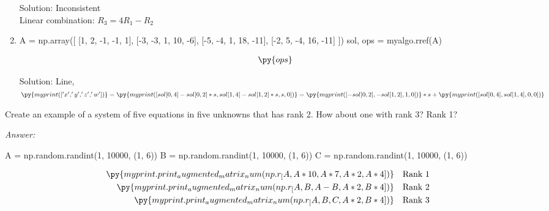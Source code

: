 \documentclass[letter]{article}
\newcommand{\ans}{\textit{Answer: }}
\newenvironment{question}[2][Question]{\begin{trivlist}
\item[\hskip \labelsep {\bfseries #1}\hskip \labelsep {\bfseries #2.}]}{\end{trivlist}}
\begin{document}
\begin{question}{1.55}
\begin{enumerate}[label=\alph*]
  Solution: Inconsistent \\
  Linear combination: $R_3 = 4R_1 - R_2$

  \item \begin{pycode}
A = np.array([
  [1, 2, -1, -1, 1],
  [-3, -3, 1, 10, -6],
  [-5, -4, 1, 18, -11],
  [-2, 5, -4, 16, -11]
])
sol, ops = myalgo.rref(A)
  \end{pycode}
  \begin{align*}
    \py{ops}
  \end{align*}

  Solution: Line, $
  \py{myprint(['x', 'y', 'z', 'w'])} 
  = \py{myprint([
      sol[0, 4]-sol[0, 2] * s,
      sol[1, 4]-sol[1, 2] * s,
      s,
      0
    ])} 
  = \py{myprint([
      -sol[0, 2],
      -sol[1, 2],
      1,
      0
    ])} * s + \py{myprint([
      sol[0, 4],
      sol[1, 4],
      0,
      0
    ])}
  $

\end{enumerate}
  
\end{question}

\begin{question}{1.57}
  Create an example of a system of five equations in five unknowns that has rank 2. How about one with rank 3? Rank 1?

  \ans 
  
  \begin{pycode}
A = np.random.randint(1, 10000, (1, 6))
B = np.random.randint(1, 10000, (1, 6))
C = np.random.randint(1, 10000, (1, 6))
  \end{pycode}

  \begin{align*}
    \py{myprint.print_augmented_matrix_num(
      np.r_[A, A * 10, A * 7, A * 2, A * 4]
    )} & & \text{Rank 1} \\
    \py{myprint.print_augmented_matrix_num(
      np.r_[A, B, A - B, A * 2, B * 4]
    )} & & \text{Rank 2} \\
    \py{myprint.print_augmented_matrix_num(
      np.r_[A, B, C, A * 2, B * 4]
    )} & & \text{Rank 3}
  \end{align*}
  
\end{question}


\end{document}
